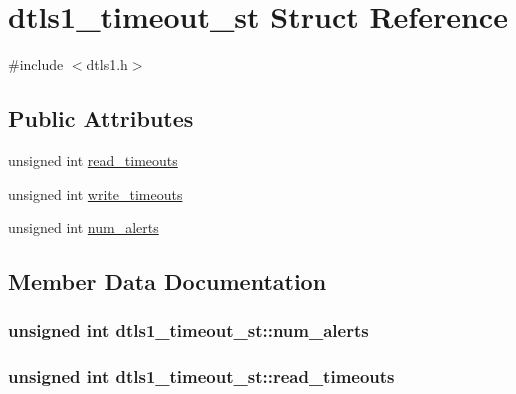 \hypertarget{structdtls1__timeout__st}{}\section{dtls1\+\_\+timeout\+\_\+st Struct Reference}
\label{structdtls1__timeout__st}


{\ttfamily \#include $<$dtls1.\+h$>$}

\subsection*{Public Attributes}
\begin{DoxyCompactItemize}
\item 
unsigned int \hyperlink{structdtls1__timeout__st_a6ea960c7ff443be84029bb3252c6e144}{read\+\_\+timeouts}
\item 
unsigned int \hyperlink{structdtls1__timeout__st_af3fb942d16bbbdf73e6151d7e4e6113b}{write\+\_\+timeouts}
\item 
unsigned int \hyperlink{structdtls1__timeout__st_ab525be86e71d151a15e58e877d1dcd4e}{num\+\_\+alerts}
\end{DoxyCompactItemize}


\subsection{Member Data Documentation}
\subsubsection[{\texorpdfstring{num\+\_\+alerts}{num_alerts}}]{\setlength{\rightskip}{0pt plus 5cm}unsigned int dtls1\+\_\+timeout\+\_\+st\+::num\+\_\+alerts}\hypertarget{structdtls1__timeout__st_ab525be86e71d151a15e58e877d1dcd4e}{}\label{structdtls1__timeout__st_ab525be86e71d151a15e58e877d1dcd4e}
\subsubsection[{\texorpdfstring{read\+\_\+timeouts}{read_timeouts}}]{\setlength{\rightskip}{0pt plus 5cm}unsigned int dtls1\+\_\+timeout\+\_\+st\+::read\+\_\+timeouts}\hypertarget{structdtls1__timeout__st_a6ea960c7ff443be84029bb3252c6e144}{}\label{structdtls1__timeout__st_a6ea960c7ff443be84029bb3252c6e144}
